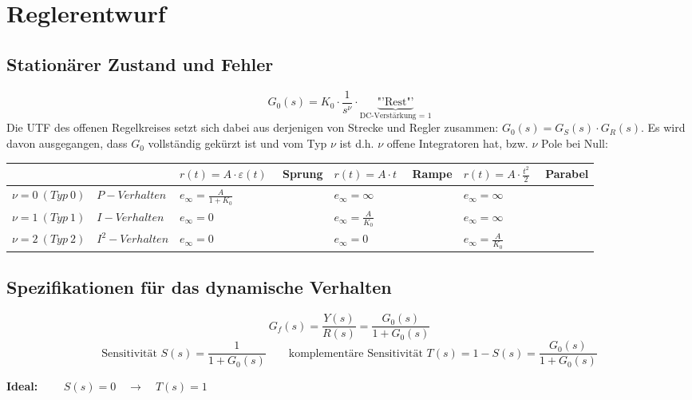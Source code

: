 \section{Reglerentwurf  }
\subsection{Stationärer Zustand und Fehler }
\[ G_0(s) = K_0 \cdot \frac{1}{s^{\nu}} \cdot \underbrace{\text{"'Rest"'}}_\textrm{DC-Verstärkung = 1} \]
Die UTF des offenen Regelkreises setzt sich dabei aus derjenigen von Strecke
und Regler zusammen: $G_0(s) = G_S(s)\cdot G_R(s)$. Es wird davon ausgegangen, dass $G_0$
vollständig gekürzt ist und vom Typ $\nu$ ist d.h. $\nu$ offene Integratoren hat, bzw. $\nu$ Pole
bei Null:
\begin{table}[h!]
	\begin{tabularx}{\textwidth}{|l||X|X|X|}
        \hline
		& $r(t)=A\cdot\varepsilon(t) \quad $ Sprung & $r(t)=A\cdot t \quad$ Rampe & $r(t)=A\cdot \frac{t^2}{2} \quad$ Parabel \\ 
		\hline\hline
		$\nu =0 \ (Typ \ 0) \quad P-Verhalten$ & $e_\infty=\frac{A}{1+K_0}$ & $e_\infty=\infty$ & $e_\infty=\infty$ \\ \hline
		$\nu =1 \ (Typ \ 1) \quad  I-Verhalten$ & $e_\infty=0$ & $e_\infty=\frac{A}{K_0}$ & $e_\infty=\infty$ \\ \hline
		$\nu =2 \ (Typ \ 2) \quad  I^2-Verhalten$ & $e_\infty=0$ & $e_\infty=0$ & $e_\infty=\frac{A}{K_0}$ \\ \hline
	\end{tabularx}
\end{table}
\subsection{Spezifikationen für das dynamische Verhalten }
\begin{equation*} 
	G_f(s)=\frac{Y(s)}{R(s)}=\frac{G_0(s)}{1+G_0(s)}
\end{equation*}
\begin{equation*}
	 \text{Sensitivität } S(s)=\frac{1}{1+G_0(s)} \qquad \text{komplementäre Sensitivität } T(s)=1-S(s)=\frac{G_0(s)}{1+G_0(s)}
\end{equation*}

\begin{center}
	\textbf{Ideal:} $\qquad S(s) = 0 \quad \rightarrow \quad T(s) =1 $
\end{center}

